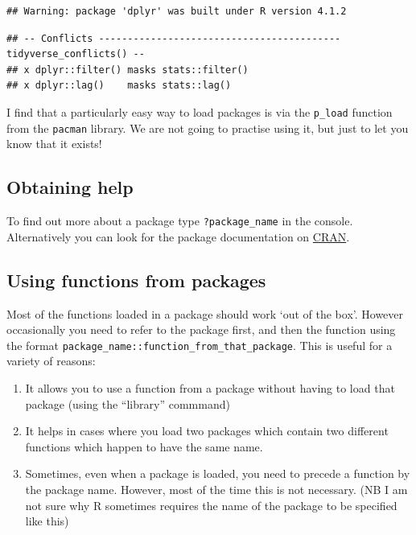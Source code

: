 \documentclass[]{article}
\providecommand{\tightlist}{%
  \setlength{\itemsep}{0pt}\setlength{\parskip}{0pt}}
\begin{document}
\begin{verbatim}
## Warning: package 'dplyr' was built under R version 4.1.2
\end{verbatim}

\begin{verbatim}
## -- Conflicts ------------------------------------------ tidyverse_conflicts() --
## x dplyr::filter() masks stats::filter()
## x dplyr::lag()    masks stats::lag()
\end{verbatim}

I find that a particularly easy way to load packages is via the
\texttt{p\_load} function from the \texttt{pacman} library. We are not
going to practise using it, but just to let you know that it exists!

\hypertarget{obtaining-help}{%
\subsection{Obtaining help}\label{obtaining-help}}

To find out more about a package type \texttt{?package\_name} in the
console. Alternatively you can look for the package documentation on
\href{https://cran.r-project.org/}{CRAN}.

\hypertarget{using-functions-from-packages}{%
\subsection{Using functions from
packages}\label{using-functions-from-packages}}

Most of the functions loaded in a package should work `out of the box'.
However occasionally you need to refer to the package first, and then
the function using the format
\texttt{package\_name::function\_from\_that\_package}. This is useful
for a variety of reasons:

\begin{enumerate}
\def\labelenumi{\arabic{enumi}.}
\tightlist
\item
  It allows you to use a function from a package without having to load
  that package (using the ``library'' commmand)
\item
  It helps in cases where you load two packages which contain two
  different functions which happen to have the same name.
\item
  Sometimes, even when a package is loaded, you need to precede a
  function by the package name. However, most of the time this is not
  necessary. (NB I am not sure why R sometimes requires the name of the
  package to be specified like this)
\end{enumerate}
\end{document}
